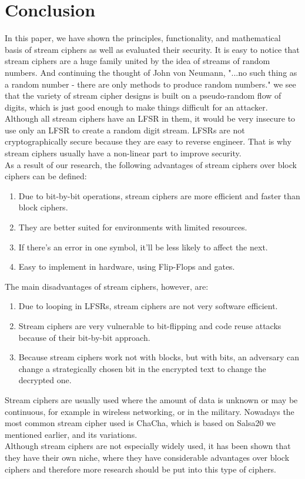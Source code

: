 	\section{Conclusion}
	In this paper, we have shown the principles, functionality, and mathematical basis of stream ciphers as well as evaluated their security. It is easy to notice that stream ciphers are a huge family united by the idea of streams of random numbers. And continuing the thought of John von Neumann, "...no such thing as a random number - there are only methods to produce random numbers." \cite[p.~36]{vonNeumann1951} we see that the variety of stream cipher designs is built on a pseudo-random flow of digits, which is just good enough to make things difficult for an attacker. Although all stream ciphers have an LFSR in them, it would be very insecure to use only an LFSR to create a random digit stream. LFSRs are not cryptographically secure because they are easy to reverse engineer. That is why stream ciphers usually have a non-linear part to improve security.\\
	As a result of our research, the following advantages of stream ciphers over block ciphers can be defined:
	\begin{enumerate}
		\setlength\itemsep{0.1em}
		\item Due to bit-by-bit operations, stream ciphers are more efficient and faster than block ciphers.
		\item They are better suited for environments with limited resources. 
		\item If there’s an error in one symbol, it’ll be less likely to affect the next.
		\item Easy to implement in hardware, using Flip-Flops and gates.
	\end{enumerate}
	The main disadvantages of stream ciphers, however, are:
	\begin{enumerate}
		\setlength\itemsep{0.1em}
		\item Due to looping in LFSRs, stream ciphers are not very software efficient.
		\item Stream ciphers are very vulnerable to bit-flipping and code reuse attacks because of their bit-by-bit approach. 
		\item Because stream ciphers work not with blocks, but with bits, an adversary can change a strategically chosen bit in the encrypted text to change the decrypted one.
	\end{enumerate}
	
	Stream ciphers are usually used where the amount of data is unknown or may be continuous, for example in wireless networking, or in the military. Nowadays the most common stream cipher used is ChaCha, which is based on Salsa20 we mentioned earlier, and its variations. \\
	Although stream ciphers are not especially widely used, it has been shown that they have their own niche, where they have considerable advantages over block ciphers and therefore more research should be put into this type of ciphers.
	\clearpage